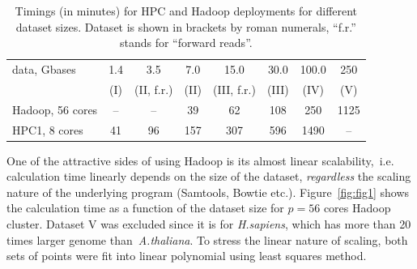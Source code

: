 \documentclass[11pt, oneside]{article}   	%
\begin{document}
\begin{table}[htdp]
\caption{Timings  (in minutes) for HPC and  Hadoop deployments for different dataset sizes.    Dataset is shown in brackets by roman numerals, ``f.r.'' stands for ``forward reads''.}
\begin{center}
\begin{tabular}{|l|c|c|c|c|c|c|c|}

data, Gbases&	1.4&	3.5&	7.0 	&15.0 	&30.0 	&100.0 	&250 	\\
			&	(I)			& (II, f.r.)	&	(II)		&(III, f.r.) &(III)&(IV) &(V)\\
\hline
Hadoop, 56 cores&--&	--	&39		&62	&108	&250&1125\\
\hline
HPC1, 8 cores&	41&	96	&157	&307	&596	&1490&--\\


\end{tabular}
\end{center}
\label{table:2}
\end{table}%


One of the attractive sides of using Hadoop is its almost linear scalability,~i.e. calculation time linearly depends on the size of the dataset\cite{crossbow,seal}, {\it regardless} the scaling nature of the underlying program (Samtools, Bowtie etc.). 
Figure~\ref{fig:fig1} shows the calculation time as a function of the dataset size for $p=56$ cores Hadoop cluster. Dataset V was excluded since it is for {\it H.sapiens}, which has more than 20 times larger genome than~{\it A.thaliana}.
To stress the linear nature of scaling, both sets of points were fit into linear polynomial using least squares method.
\end{document}
